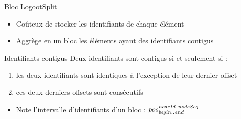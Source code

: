 \begin{frame}[fragile]{Bloc LogootSplit}
    \begin{itemize}
        \item Coûteux de stocker les identifiants de chaque élément
    \end{itemize}
    \begin{figure}[!ht]
    \end{figure}
    \pause
    \vspace{-1em}
    \begin{itemize}
        \item Aggrège en un \alert{bloc} les éléments ayant des \alert{identifiants contigus}
    \end{itemize}
    \begin{block}{Identifiants contigus}
        Deux identifiants sont contigus si et seulement si :
        \begin{enumerate}
            \item les deux identifiants sont identiques à l'exception de leur dernier offset
            \item ces deux derniers offsets sont consécutifs
        \end{enumerate}
    \end{block}
    \pause
    \begin{itemize}
        \item Note l'intervalle d'identifiants d'un bloc : $\mathit{pos}^{\mathit{nodeId~nodeSeq}}_{\mathit{begin..end}}$
    \end{itemize}
    \begin{figure}[!ht]
    \end{figure}
\end{frame}

